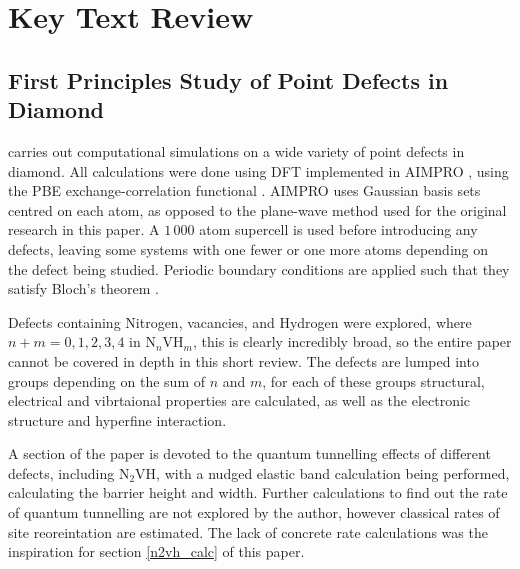 \documentclass[10pt,a4paper,twocolumn,twoside]{extarticle}
\newcommand{\ntvh}{N$_2$VH}
\begin{document}


\section{Key Text Review}

\subsection{First Principles Study of Point Defects in Diamond}
\textcite{Peaker} carries out computational simulations on a wide variety of point defects in diamond. All calculations were done using DFT implemented in AIMPRO \cite{AIMPRO}, using the PBE exchange-correlation functional \cite{PBE}. AIMPRO uses Gaussian basis sets centred on each atom, as opposed to the plane-wave method used for the original research in this paper. A $1\,000$ atom supercell is used before introducing any defects, leaving some systems with one fewer or one more atoms depending on the defect being studied. Periodic boundary conditions are applied such that they satisfy Bloch's theorem \cite{Bloch}. 

Defects containing Nitrogen, vacancies, and Hydrogen were explored, where $n +m = 0, 1, 2, 3, 4$ in N$_n$VH$_m$, this is clearly incredibly broad, so the entire paper cannot be covered in depth in this short review. The defects are lumped into groups depending on the sum of $n$ and $m$, for each of these groups structural, electrical and vibrtaional properties are calculated, as well as the electronic structure and hyperfine interaction.

A section of the paper is devoted to the quantum tunnelling effects of different defects, including {\ntvh}, with a nudged elastic band calculation being performed, calculating the barrier height and width. Further calculations to find out the rate of quantum tunnelling are not explored by the author, however classical rates of site reoreintation are estimated. The lack of concrete rate calculations was the inspiration for section \ref{n2vh_calc} of this paper.
\end{document}
